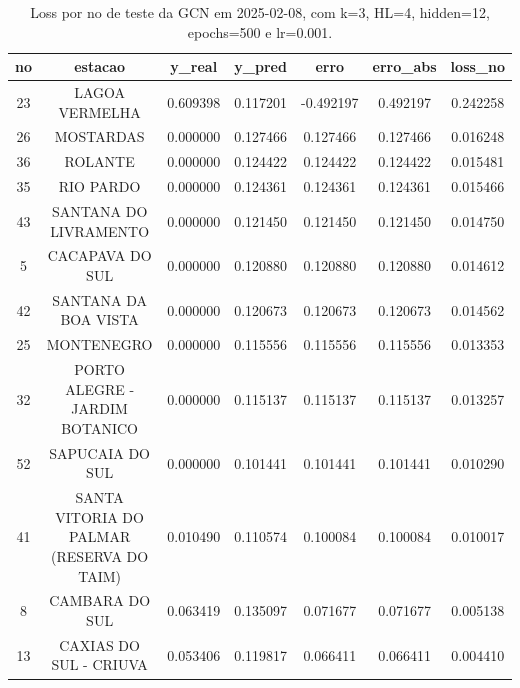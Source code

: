 \begin{table}[h]
\centering
\caption{Loss por no de teste da GCN em 2025-02-08, com k=3, HL=4, hidden=12, epochs=500 e lr=0.001.}
\label{tab:gcn_loss_k3_hl4_h12_e500_d20250208}
\begin{tabular}{ccccccc}
\toprule
no & estacao & y\_real & y\_pred & erro & erro\_abs & loss\_no \\
\midrule
23 & LAGOA VERMELHA & 0.609398 & 0.117201 & -0.492197 & 0.492197 & 0.242258 \\
26 & MOSTARDAS & 0.000000 & 0.127466 & 0.127466 & 0.127466 & 0.016248 \\
36 & ROLANTE & 0.000000 & 0.124422 & 0.124422 & 0.124422 & 0.015481 \\
35 & RIO PARDO & 0.000000 & 0.124361 & 0.124361 & 0.124361 & 0.015466 \\
43 & SANTANA DO LIVRAMENTO & 0.000000 & 0.121450 & 0.121450 & 0.121450 & 0.014750 \\
5 & CACAPAVA DO SUL & 0.000000 & 0.120880 & 0.120880 & 0.120880 & 0.014612 \\
42 & SANTANA DA BOA VISTA & 0.000000 & 0.120673 & 0.120673 & 0.120673 & 0.014562 \\
25 & MONTENEGRO & 0.000000 & 0.115556 & 0.115556 & 0.115556 & 0.013353 \\
32 & PORTO ALEGRE - JARDIM BOTANICO & 0.000000 & 0.115137 & 0.115137 & 0.115137 & 0.013257 \\
52 & SAPUCAIA DO SUL & 0.000000 & 0.101441 & 0.101441 & 0.101441 & 0.010290 \\
41 & SANTA VITORIA DO PALMAR (RESERVA DO TAIM) & 0.010490 & 0.110574 & 0.100084 & 0.100084 & 0.010017 \\
8 & CAMBARA DO SUL & 0.063419 & 0.135097 & 0.071677 & 0.071677 & 0.005138 \\
13 & CAXIAS DO SUL - CRIUVA & 0.053406 & 0.119817 & 0.066411 & 0.066411 & 0.004410 \\
\bottomrule
\end{tabular}
\end{table}

